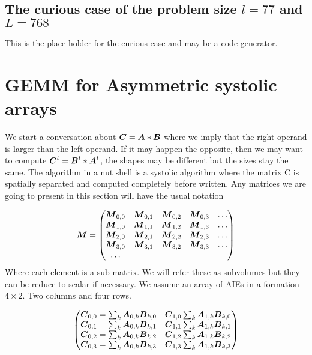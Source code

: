 \documentclass[conference]{IEEEtran}
\begin{document}
\subsection{The curious case of the problem size $l=77$ and $L=768$}

This is the place holder for the curious case and may be a code
generator. 


\newpage
\section{GEMM for Asymmetric systolic arrays}

We start a conversation about ${\boldsymbol C} = {\boldsymbol A}*{\boldsymbol B}$ where we imply
that the right operand is larger than the left operand. If it may
happen the opposite, then we may want to compute ${\boldsymbol C}^t =
{\boldsymbol B}^t*{\boldsymbol A}^t$, the shapes may be different but the sizes stay the
same. The algorithm in a nut shell is a systolic algorithm where the
matrix C is spatially separated and computed completely before
written. Any matrices we are going to present in this section will
have the usual notation

\begin{equation*} {\boldsymbol M} =
    \begin{pmatrix}
    {\boldsymbol M}_{0,0} & {\boldsymbol M}_{0,1} & {\boldsymbol M}_{0,2} & {\boldsymbol M}_{0,3} & \dots \\
    {\boldsymbol M}_{1,0} & {\boldsymbol M}_{1,1} & {\boldsymbol M}_{1,2} & {\boldsymbol M}_{1,3} & \dots \\
    {\boldsymbol M}_{2,0} & {\boldsymbol M}_{2,1} & {\boldsymbol M}_{2,2} & {\boldsymbol M}_{2,3} & \dots \\
    {\boldsymbol M}_{3,0} & {\boldsymbol M}_{3,1} & {\boldsymbol M}_{3,2} & {\boldsymbol M}_{3,3} & \dots \\
    \dots
  \end{pmatrix}  
\end{equation*}
Where each element is a sub matrix. We will refer these as subvolumes
but they can be reduce to scalar if necessary.  We assume an array of
AIEs in a formation $4 \times 2$. Two columns and four rows.

{\small \begin{equation}
  \label{eq:gemm-fatc}
  \begin{pmatrix}
    \Vc{C}_{0,0} = \sum_k \Vc{A}_{0,k}\Vc{B}_{k,0} & \Vc{C}_{1,0} \sum_k \Vc{A}_{1,k}\Vc{B}_{k,0}\\
    \Vc{C}_{0,1} = \sum_k \Vc{A}_{0,k}\Vc{B}_{k,1} & \Vc{C}_{1,1} \sum_k \Vc{A}_{1,k}\Vc{B}_{k,1}\\
    \Vc{C}_{0,2} = \sum_k \Vc{A}_{0,k}\Vc{B}_{k,2} & \Vc{C}_{1,2} \sum_k \Vc{A}_{1,k}\Vc{B}_{k,2}\\
    \Vc{C}_{0,3} = \sum_k \Vc{A}_{0,k}\Vc{B}_{k,3} & \Vc{C}_{1,3} \sum_k \Vc{A}_{1,k}\Vc{B}_{k,3}\\
  \end{pmatrix}  
\end{equation}
}
\end{document}
